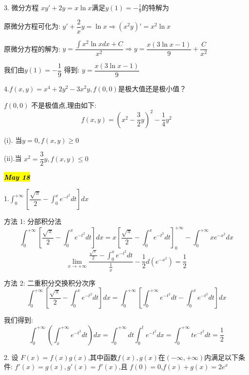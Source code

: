 
3. 微分方程 $xy'+2y=x\ln x\text{满足}y(1)=-\frac{1}{9}\text{的特解为}$
\begin{solution}
	
	原微分方程可化为: $y'+\dfrac{2}{x}y=\ln x\Rightarrow (x^2y)'=x^2\ln x$
	
	原微分方程的解为: $y=\dfrac{\int x^2\ln xdx+C}{x^2}\Rightarrow y=\dfrac{x(3\ln x-1)}{9}+\dfrac{C}{x^2}$
	
	我们由$y(1)=-\dfrac{1}{9}$ 得到: $y=\dfrac{x(3\ln x-1)}{9}$
\end{solution}


4.$f(x,y)=x^4+2y^2-3x^2y,f(0,0)\text{是极大值还是极小值？}$
\begin{solution}
	
	$f(0,0)$ 不是极值点,理由如下: 
	$$f(x,y)=(x^2-\frac{3}{2}y)^2-\frac{1}{4}y^2$$
	
	(i). 当$y=0,f(x,y)\geq 0$
	
	(ii).当 $x^2=\dfrac{3}{2}y,f(x,y)\leq 0$
\end{solution}


\hl{\textbf{\textit{May 18}}}

1.$\int_{0}^{+\infty}\left[ \dfrac{\sqrt{\pi}}{2}-\int_{0}^{x}e^{-t^2}dt\right]dx$
\begin{solution}
	
	方法 1:  分部积分法
	$$\int_{0}^{+\infty}\left[ \frac{\sqrt{\pi}}{2}-\int_{0}^{x}e^{-t^2}dt\right]dx=x\left[ \frac{\sqrt{\pi}}{2}-\int_{0}^{x}e^{-t^2}dt\right]_{0}^{+\infty}-\int_{0}^{+\infty}xe^{-x^2}dx$$
	$$\lim\limits_{x\rightarrow +\infty}\frac{\frac{\sqrt{\pi}}{2}-\int_{0}^{x}e^{-t^2}dt}{\frac{1}{x}}-\frac{1}{2}d(e^{-x^2})=\frac{1}{2}$$
	
	
	方法 2:  二重积分交换积分次序
	$$\int_{0}^{+\infty}\left[ \frac{\sqrt{\pi}}{2}-\int_{0}^{x}e^{-t^2}dt\right]dx=\int_{0}^{+\infty}\left[\int_{0}^{+\infty}e^{-t^2}dt-\int_{0}^{x}e^{-t^2}dt\right]dx$$
	
	我们得到: 
	$$\int_{0}^{+\infty}(\int_{x}^{+\infty}e^{-t^2}dt)dx=\int_{0}^{+\infty}dt\int_{0}^{t}e^{-t^2}dx=\int_{0}^{+\infty}te^{-t^2}dt=\frac{1}{2}$$
\end{solution}


2. 设 $F(x)=f(x)g(x)$,其中函数$f(x),g(x)$在$(-\infty,+\infty)$内满足以下条件: $f'(x)=g(x),g'(x)=f'(x)$,且 $f(0)=0$,$f(x)+g(x)=2e^x$

